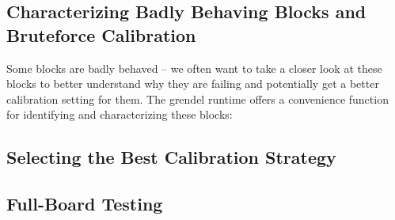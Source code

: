 \subsection{Characterizing Badly Behaving Blocks and Bruteforce Calibration}

Some blocks are badly behaved -- we often want to take a closer look at these
blocks to better understand why they are failing and potentially get a better
calibration setting for them. The grendel runtime offers a
convenience function for identifying and characterizing these blocks:



\subsection{Selecting the Best Calibration Strategy}

\subsection{Full-Board Testing}

